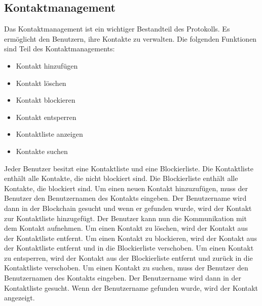 \subsection{Kontaktmanagement}

Das Kontaktmanagement ist ein wichtiger Bestandteil des Protokolls. Es ermöglicht den Benutzern, ihre Kontakte
zu verwalten. Die folgenden Funktionen sind Teil des Kontaktmanagements:

\begin{itemize}
    \item Kontakt hinzufügen
    \item Kontakt löschen
    \item Kontakt blockieren
    \item Kontakt entsperren
    \item Kontaktliste anzeigen
    \item Kontakte suchen
\end{itemize}

\noindent Jeder Benutzer besitzt eine Kontaktliste und eine Blockierliste. Die Kontaktliste enthält alle Kontakte,
die nicht blockiert sind. Die Blockierliste enthält alle Kontakte, die blockiert sind.
Um einen neuen Kontakt hinzuzufügen, muss der Benutzer den Benutzernamen des Kontakts eingeben. 
Der Benutzername wird dann in der Blockchain gesucht und wenn er gefunden wurde, wird der Kontakt zur 
Kontaktliste hinzugefügt. Der Benutzer kann nun die Kommunikation mit dem Kontakt aufnehmen.
Um einen Kontakt zu löschen, wird der Kontakt aus der Kontaktliste entfernt. Um einen Kontakt zu blockieren,
wird der Kontakt aus der Kontaktliste entfernt und in die Blockierliste verschoben. Um einen Kontakt zu entsperren,
wird der Kontakt aus der Blockierliste entfernt und zurück in die Kontaktliste verschoben.
Um einen Kontakt zu suchen, muss der Benutzer den Benutzernamen des Kontakts eingeben. Der Benutzername
wird dann in der Kontaktliste gesucht. Wenn der Benutzername gefunden wurde, wird der Kontakt angezeigt.
